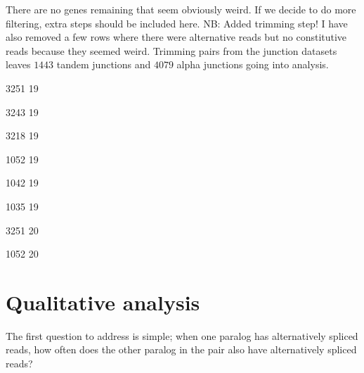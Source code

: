 \documentclass{article}
\begin{document}
There are no genes remaining that seem obviously weird. If we decide to do more filtering, extra steps should be included here. NB: Added trimming step! I have also removed a few rows where there were alternative reads but no constitutive reads because they seemed weird. Trimming pairs from the junction datasets leaves $1443$ tandem junctions and $4079$ alpha junctions going into analysis.


\begin{Schunk}
\begin{Soutput}
[1] 3251   19
\end{Soutput}
\begin{Soutput}
[1] 3243   19
\end{Soutput}
\begin{Soutput}
[1] 3218   19
\end{Soutput}
\begin{Soutput}
[1] 1052   19
\end{Soutput}
\begin{Soutput}
[1] 1042   19
\end{Soutput}
\begin{Soutput}
[1] 1035   19
\end{Soutput}
\begin{Soutput}
[1] 3251   20
\end{Soutput}
\begin{Soutput}
[1] 1052   20
\end{Soutput}
\end{Schunk}


\section*{Qualitative analysis}

The first question to address is simple; when one paralog has alternatively spliced reads, how often does the other paralog in the pair also have alternatively spliced reads?\
\end{document}
